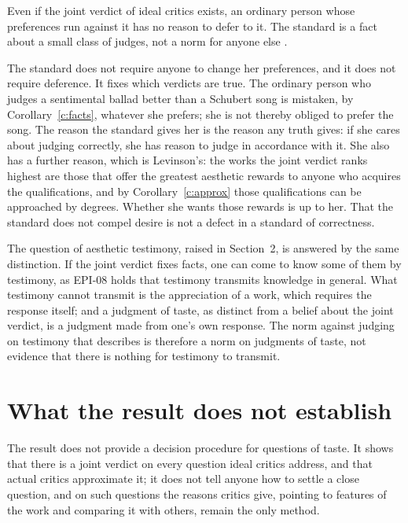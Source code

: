 \documentclass{situationist-preprint}
\begin{document}
\begin{objection}\label{o:levinson}
Even if the joint verdict of ideal critics exists, an ordinary person whose preferences run against it has no reason to defer to it. The standard is a fact about a small class of judges, not a norm for anyone else \citep{Levinson2002}.
\end{objection}

\begin{reply}
The standard does not require anyone to change her preferences, and it does not require deference. It fixes which verdicts are true. The ordinary person who judges a sentimental ballad better than a Schubert song is mistaken, by Corollary~\ref{c:facts}, whatever she prefers; she is not thereby obliged to prefer the song. The reason the standard gives her is the reason any truth gives: if she cares about judging correctly, she has reason to judge in accordance with it. She also has a further reason, which is Levinson's: the works the joint verdict ranks highest are those that offer the greatest aesthetic rewards to anyone who acquires the qualifications, and by Corollary~\ref{c:approx} those qualifications can be approached by degrees. Whether she wants those rewards is up to her. That the standard does not compel desire is not a defect in a standard of correctness.
\end{reply}

The question of aesthetic testimony, raised in Section~2, is answered by the same distinction. If the joint verdict fixes facts, one can come to know some of them by testimony, as EPI-08 holds that testimony transmits knowledge in general. What testimony cannot transmit is the appreciation of a work, which requires the response itself; and a judgment of taste, as distinct from a belief about the joint verdict, is a judgment made from one's own response. The norm against judging on testimony that \citet{Hopkins2011} describes is therefore a norm on judgments of taste, not evidence that there is nothing for testimony to transmit.

\section{What the result does not establish}\label{s:limits}

The result does not provide a decision procedure for questions of taste. It shows that there is a joint verdict on every question ideal critics address, and that actual critics approximate it; it does not tell anyone how to settle a close question, and on such questions the reasons critics give, pointing to features of the work and comparing it with others, remain the only method.
\end{document}
